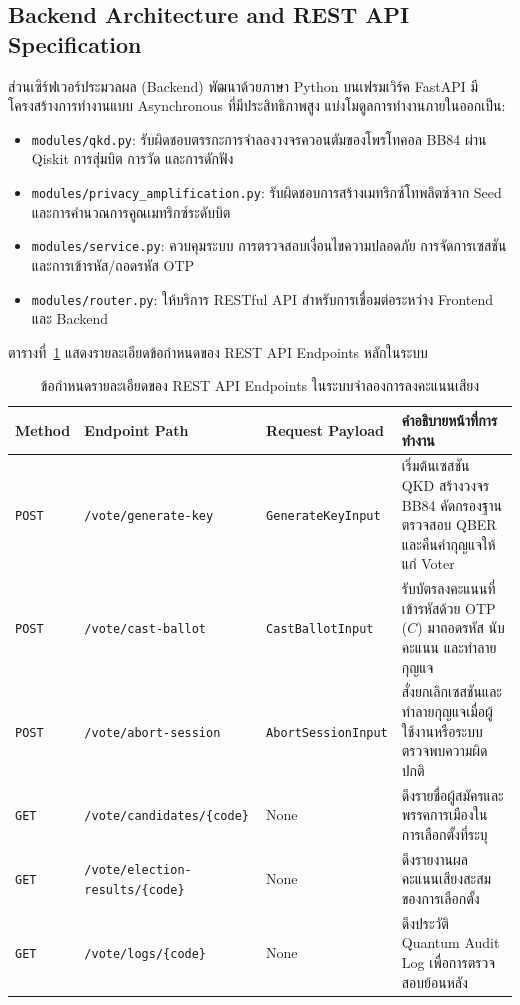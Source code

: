 \subsection{Backend Architecture and REST API Specification}
ส่วนเซิร์ฟเวอร์ประมวลผล (Backend) พัฒนาด้วยภาษา Python บนเฟรมเวิร์ค FastAPI มีโครงสร้างการทำงานแบบ Asynchronous ที่มีประสิทธิภาพสูง แบ่งโมดูลการทำงานภายในออกเป็น:
\begin{itemize}
    \item \texttt{modules/qkd.py}: รับผิดชอบตรรกะการจำลองวงจรควอนตัมของโพรโทคอล BB84 ผ่าน Qiskit การสุ่มบิต การวัด และการดักฟัง
    \item \texttt{modules/privacy\_amplification.py}: รับผิดชอบการสร้างเมทริกซ์โทพลิตซ์จาก Seed และการคำนวณการคูณเมทริกซ์ระดับบิต
    \item \texttt{modules/service.py}: ควบคุมระบบ การตรวจสอบเงื่อนไขความปลอดภัย การจัดการเซสชัน และการเข้ารหัส/ถอดรหัส OTP
    \item \texttt{modules/router.py}: ให้บริการ RESTful API สำหรับการเชื่อมต่อระหว่าง Frontend และ Backend
\end{itemize}

ตารางที่~\ref{tab:api_endpoints} แสดงรายละเอียดข้อกำหนดของ REST API Endpoints หลักในระบบ

\begin{table}[htbp]
\centering
\renewcommand{\arraystretch}{1.35}
\setlength{\extrarowheight}{2.5pt}
\begin{tabularx}{\textwidth}{p{1.4cm}p{3.8cm}p{3.2cm}X}
\hline
\textbf{Method} & \textbf{Endpoint Path} & \textbf{Request Payload} & \textbf{คำอธิบายหน้าที่การทำงาน} \\ \hline
\rowcolor{white}
\texttt{POST} & \texttt{/vote/generate-key} & \texttt{GenerateKeyInput} & เริ่มต้นเซสชัน QKD สร้างวงจร BB84 คัดกรองฐาน ตรวจสอบ QBER และคืนค่ากุญแจให้แก่ Voter \\
\rowcolor[HTML]{E4E7EB}
\texttt{POST} & \texttt{/vote/cast-ballot} & \texttt{CastBallotInput} & รับบัตรลงคะแนนที่เข้ารหัสด้วย OTP ($C$) มาถอดรหัส นับคะแนน และทำลายกุญแจ \\
\rowcolor{white}
\texttt{POST} & \texttt{/vote/abort-session} & \texttt{AbortSessionInput} & สั่งยกเลิกเซสชันและทำลายกุญแจเมื่อผู้ใช้งานหรือระบบตรวจพบความผิดปกติ \\
\rowcolor[HTML]{E4E7EB}
\texttt{GET} & \texttt{/vote/candidates/\{code\}} & None & ดึงรายชื่อผู้สมัครและพรรคการเมืองในการเลือกตั้งที่ระบุ \\
\rowcolor{white}
\texttt{GET} & \texttt{/vote/election-results/\{code\}} & None & ดึงรายงานผลคะแนนเสียงสะสมของการเลือกตั้ง \\
\rowcolor[HTML]{E4E7EB}
\texttt{GET} & \texttt{/vote/logs/\{code\}} & None & ดึงประวัติ Quantum Audit Log เพื่อการตรวจสอบย้อนหลัง \\ \hline
\end{tabularx}
\caption{ข้อกำหนดรายละเอียดของ REST API Endpoints ในระบบจำลองการลงคะแนนเสียง}
\label{tab:api_endpoints}
\end{table}

